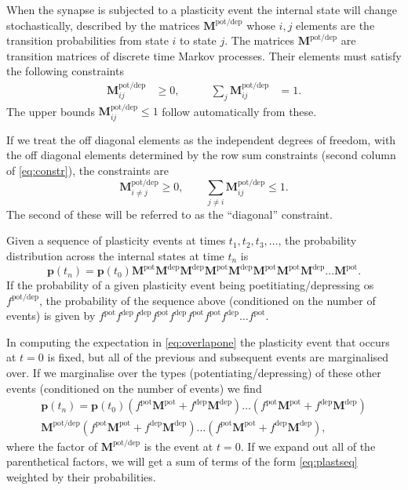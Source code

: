 \documentclass[12pt]{article}
\newcommand{\pr}{\mathbf{p}}
\newcommand{\M}{\mathbf{M}}
\newcommand{\pot}{^{\text{pot}}}
\newcommand{\dep}{^{\text{dep}}}
\newcommand{\potdep}{^{\text{pot/dep}}}
\begin{document}
When the synapse is subjected to a plasticity event the internal state will change stochastically, described by the matrices $\M\potdep$ whose $i,j$ elements are the transition probabilities from state $i$ to state $j$.
The matrices $\M\potdep$ are transition matrices of discrete time Markov processes.
Their elements must satisfy the following constraints
%
\begin{equation}\label{eq:constr}
\begin{aligned}
  \M\potdep_{ij} &\geq 0, &\qquad
  \sum_j \M\potdep_{ij} &= 1.
\end{aligned}
\end{equation}
%
The upper bounds $\M\potdep_{ij} \leq 1$ follow automatically from these.

If we treat the off diagonal elements as the independent degrees of freedom, with the off diagonal elements determined by the row sum constraints (second column of \eqref{eq:constr}), the constraints are
%
\begin{equation}\label{eq:constri}
  \M\potdep_{i \neq j} \geq 0, \qquad
  \sum_{j\neq i} \M\potdep_{ij} \leq 1.
\end{equation}
%
The second of these will be referred to as the ``diagonal'' constraint.

Given a sequence of plasticity events at times $t_1,t_2,t_3,\ldots$, the probability distribution across the internal states at time $t_n$ is
%
\begin{equation}\label{eq:plastseq}
  \pr(t_n) = \pr(t_0)  \M\pot \M\dep \M\dep \M\pot \M\dep \M\pot \M\pot \M\dep \ldots \M\pot .
\end{equation}
%
If the probability of a given plasticity event being poetitiating/depressing os $f\potdep$, the probability of the sequence above (conditioned on the number of events) is given by $f\pot f\dep f\dep f\pot f\dep f\pot f\pot f\dep \ldots f\pot$.

In computing the expectation in \eqref{eq:overlapone} the plasticity event that occurs at $t=0$ is fixed, but all of the previous and subsequent events are marginalised over.
If we marginalise over the types (potentiating/depressing) of these other events (conditioned on the number of events) we find
%
\begin{multline}\label{eq:plastseqtypes}
  \pr(t_n) = \pr(t_0) (f\pot\M\pot+f\dep\M\dep)  \ldots (f\pot\M\pot+f\dep\M\dep) \\
    \M\potdep (f\pot\M\pot+f\dep\M\dep) \ldots (f\pot\M\pot+f\dep\M\dep),
\end{multline}
%
where the factor of $\M\potdep$ is the event at $t=0$.
If we expand out all of the parenthetical factors, we will get a sum of terms of the form \eqref{eq:plastseq} weighted by their probabilities.
\end{document}
